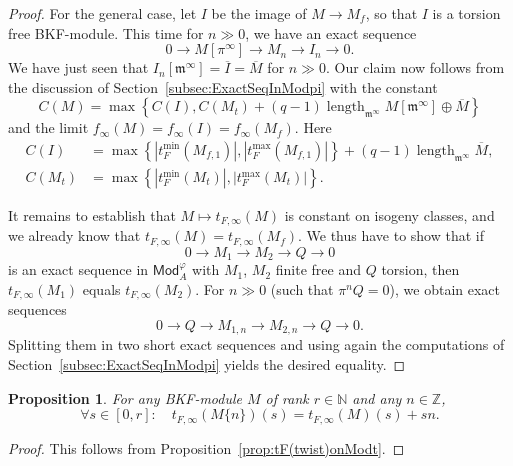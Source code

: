 \documentclass[11pt]{article}
\newtheorem{prop}[theo]{Proposition}
\theoremstyle{definition}
\numberwithin{equation}{section}
\numberwithin{figure}{section}
\numberwithin{table}{section}
\newcommand{\Mod}{\mathsf{Mod}}
\DeclareMathOperator{\length}{length}
\let\oldforall\forall
\renewcommand*{\forall}{\mathrel{\oldforall}}
\begin{document}
\begin{proof}
For the general case, let $I$ be the image of $M\rightarrow M_{f}$, so that $I$ is a torsion free BKF-module. This time for $n\gg0$, we have an exact sequence
\[
0\rightarrow M[\pi^{\infty}]\rightarrow M_{n}\rightarrow I_{n}\rightarrow0.
\]
We have just seen that $I_{n}[\mathfrak{m}^{\infty}]=\overline{I}=\overline{M}$ for $n\gg0$. Our claim now follows from the discussion of Section~\ref{subsec:ExactSeqInModpi} with the constant
\[
C(M)=\max\left\{ C(I),C(M_{t})+(q-1)\length_{\mathfrak{m}^{\infty}}M[\mathfrak{m}^{\infty}]\oplus\overline{M}\right\}
\]
and the limit $f_{\infty}(M)=f_{\infty}(I)=f_{\infty}(M_{f})$. Here
\begin{align*}
C(I) & = \max\left\{ \left|t_{F}^{\min}(M_{f,1})\right|,\left|t_{F}^{\max}(M_{f,1})\right|\right\} +(q-1)\length_{\mathfrak{m}^{\infty}}\overline{M},\\
C(M_{t}) & = \max\left\{ \left|t_{F}^{\min}(M_{t})\right|,\left|t_{F}^{\max}(M_{t})\right|\right\}.
\end{align*}

It remains to establish that $M\mapsto t_{F,\infty}(M)$ is constant on isogeny classes, and we already know that $t_{F,\infty}(M)=t_{F,\infty}(M_{f})$. We thus have to show that if
\[
0\rightarrow M_{1}\rightarrow M_{2}\rightarrow Q\rightarrow0
\]
is an exact sequence in $\Mod_{A}^{\varphi}$ with $M_{1}$, $M_{2}$ finite free and $Q$ torsion, then $t_{F,\infty}(M_{1})$ equals $t_{F,\infty}(M_{2})$. For $n\gg0$ (such that $\pi^{n}Q=0$), we obtain exact sequences
\[
0\rightarrow Q\rightarrow M_{1,n}\rightarrow M_{2,n}\rightarrow Q\rightarrow0.
\]
Splitting them in two short exact sequences and using again the computations of Section~\ref{subsec:ExactSeqInModpi} yields the desired equality.
\end{proof}

\begin{prop}\label{prop:tFinfty(twist)onMod*}
For any BKF-module $M$ of rank $r\in\mathbb{N}$ and any $n\in\mathbb{Z}$,
\[
\forall s\in[0,r]:\quad t_{F,\infty}(M\{n\})(s)=t_{F,\infty}(M)(s)+sn.
\]
\end{prop}

\begin{proof}
This follows from Proposition~\ref{prop:tF(twist)onModt}.
\end{proof}

\subsubsection{}\label{subsec:TypeHN}
\end{document}
